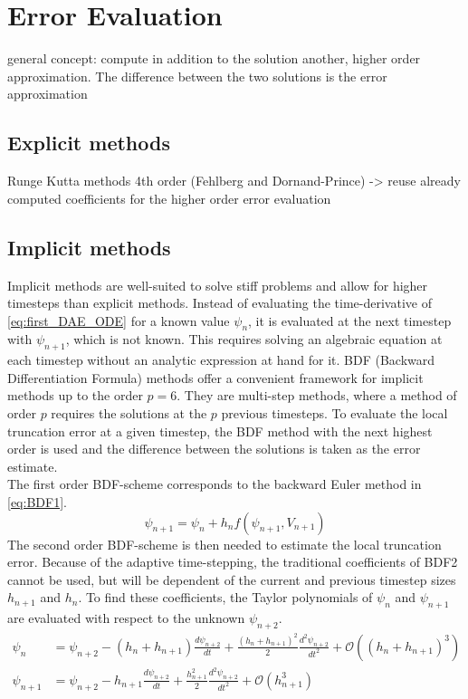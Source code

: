 \documentclass{report}
\begin{document}
\section{Error Evaluation}
general concept: compute in addition to the solution another, higher order approximation. The difference between the two solutions is the error approximation
\subsection{Explicit methods}
Runge Kutta methods 4th order (Fehlberg and Dornand-Prince) -> reuse already computed coefficients for the higher order error evaluation
\subsection{Implicit methods}
Implicit methods are well-suited to solve stiff problems and allow for higher timesteps than explicit methods. Instead of evaluating the time-derivative of \autoref{eq:first_DAE_ODE} for a known value $\psi_n$, it is evaluated at the next timestep with $\psi_{n+1}$, which is not known. This requires solving an algebraic equation at each timestep without an analytic expression at hand for it. BDF (Backward Differentiation Formula) methods offer a convenient framework for implicit methods up to the order $p=6$. They are multi-step methods, where a method of order $p$ requires the solutions at the $p$ previous timesteps. To evaluate the local truncation error at a given timestep, the BDF method with the next highest order is used and the difference between the solutions is taken as the error estimate. \\
The first order BDF-scheme corresponds to the backward Euler method in \autoref{eq:BDF1}.
\begin{equation}
    \label{eq:BDF1}
    \psi_{n+1} = \psi_n + h_{n}f(\psi_{n+1},V_{n+1})
\end{equation}
The second order BDF-scheme is then needed to estimate the local truncation error. Because of the adaptive time-stepping, the traditional coefficients of BDF2 cannot be used, but will be dependent of the current and previous timestep sizes $h_{n+1}$ and $h_n$. To find these coefficients, the Taylor polynomials of $\psi_n$ and $\psi_{n+1}$ are evaluated with respect to the unknown $\psi_{n+2}$. 
\begin{align}
    \label{eq:taylor-polynomialBDF1(1)}
    \psi_{n} &= \psi_{n+2} - (h_{n} + h_{n+1})\frac{d\psi_{n+2}}{dt} + \frac{(h_{n} + h_{n+1})^2}{2}\frac{d^2\psi_{n+2}}{dt^2} + \mathcal{O}\left((h_{n} + h_{n+1})^3\right) \\
    \label{eq:taylor-polynomialBDF1(2)}
    \psi_{n+1} &= \psi_{n+2} - h_{n+1}\frac{d\psi_{n+2}}{dt} + \frac{h_{n+1}^2}{2}\frac{d^2\psi_{n+2}}{dt^2} + \mathcal{O}\left(h_{n+1}^3\right)
\end{align}
\end{document}
